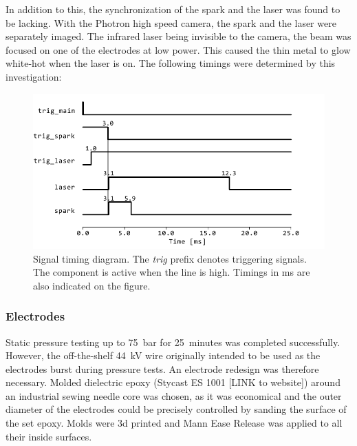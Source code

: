             In addition to this, the synchronization of the spark and the laser was found to be lacking. With the Photron high speed camera, the spark and the laser were separately imaged. The infrared laser being invisible to the camera, the beam was focused on one of the electrodes at low power. This caused the thin metal to glow white-hot when the laser is on. The following timings were determined by this investigation:

            \begin{figure}
                \centering
                \includegraphics[width=\textwidth]{assets/4 experiments/timings.pdf}
                \caption{Signal timing diagram. The \textit{trig} prefix denotes triggering signals. The component is active when the line is high. Timings in \unit{ms} are also indicated on the figure.}
            \end{figure}

        \subsubsection{Electrodes}
            Static pressure testing up to \qty{75}{bar} for \qty{25}{minutes} was completed successfully. However, the off-the-shelf \qty{44}{kV} wire originally intended to be used as the electrodes burst during pressure tests. An electrode redesign was therefore necessary. Molded dielectric epoxy (Stycast ES 1001 [LINK to website]) around an industrial sewing needle core was chosen, as it was economical and the outer diameter of the electrodes could be precisely controlled by sanding the surface of the set epoxy. Molds were 3d printed and Mann Ease Release was applied to all their inside surfaces.

